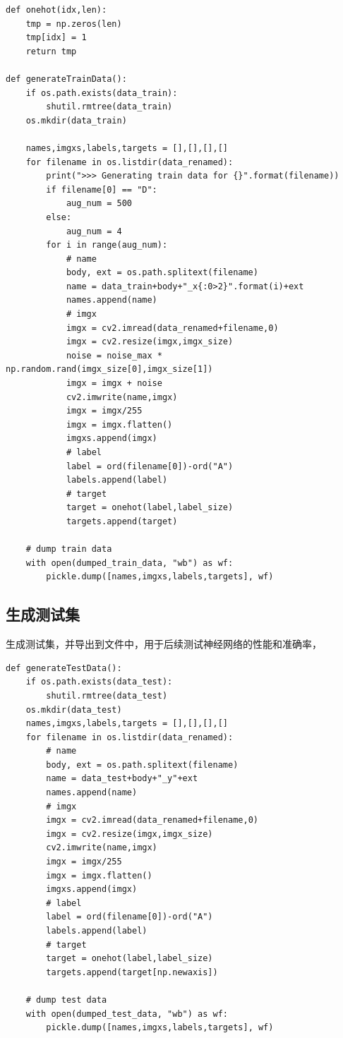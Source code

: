 \documentclass[a4paper, 12pt]{article}
\begin{document}
\begin{lstlisting}[style=myPython,caption={生成训练集}]
def onehot(idx,len):
    tmp = np.zeros(len)
    tmp[idx] = 1
    return tmp

def generateTrainData():
    if os.path.exists(data_train): 
        shutil.rmtree(data_train)
    os.mkdir(data_train)

    names,imgxs,labels,targets = [],[],[],[]
    for filename in os.listdir(data_renamed):
        print(">>> Generating train data for {}".format(filename))
        if filename[0] == "D":
            aug_num = 500
        else:
            aug_num = 4
        for i in range(aug_num):
            # name
            body, ext = os.path.splitext(filename)
            name = data_train+body+"_x{:0>2}".format(i)+ext
            names.append(name)
            # imgx
            imgx = cv2.imread(data_renamed+filename,0)
            imgx = cv2.resize(imgx,imgx_size)
            noise = noise_max * np.random.rand(imgx_size[0],imgx_size[1])
            imgx = imgx + noise
            cv2.imwrite(name,imgx)
            imgx = imgx/255
            imgx = imgx.flatten()
            imgxs.append(imgx)
            # label
            label = ord(filename[0])-ord("A")
            labels.append(label)
            # target
            target = onehot(label,label_size)
            targets.append(target)

    # dump train data
    with open(dumped_train_data, "wb") as wf:
        pickle.dump([names,imgxs,labels,targets], wf)
\end{lstlisting}

\subsection{生成测试集}
生成测试集，并导出到文件中，用于后续测试神经网络的性能和准确率，

\begin{lstlisting}[style=myPython,caption={生成测试集}]
def generateTestData():
    if os.path.exists(data_test): 
        shutil.rmtree(data_test)
    os.mkdir(data_test)
    names,imgxs,labels,targets = [],[],[],[]
    for filename in os.listdir(data_renamed):
        # name
        body, ext = os.path.splitext(filename)
        name = data_test+body+"_y"+ext
        names.append(name)
        # imgx
        imgx = cv2.imread(data_renamed+filename,0)
        imgx = cv2.resize(imgx,imgx_size)
        cv2.imwrite(name,imgx)
        imgx = imgx/255
        imgx = imgx.flatten()
        imgxs.append(imgx)
        # label
        label = ord(filename[0])-ord("A")
        labels.append(label)
        # target
        target = onehot(label,label_size)
        targets.append(target[np.newaxis])

    # dump test data
    with open(dumped_test_data, "wb") as wf:
        pickle.dump([names,imgxs,labels,targets], wf)
\end{lstlisting}
\end{document}
